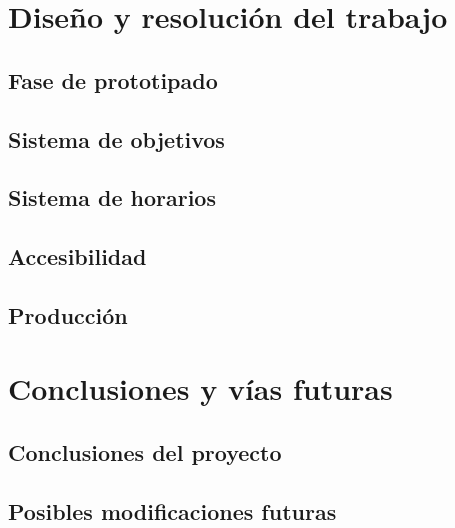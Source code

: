 \documentclass[10pt, a4paper]{aqademic}
\begin{document}
\chapter{Diseño y resolución del trabajo}

\section{Fase de prototipado}

\section{Sistema de objetivos}

\section{Sistema de horarios}

\section{Accesibilidad}

\section{Producción}


\chapter{Conclusiones y vías futuras}

\section{Conclusiones del proyecto}

\section{Posibles modificaciones futuras}

\newpage



\end{document}
